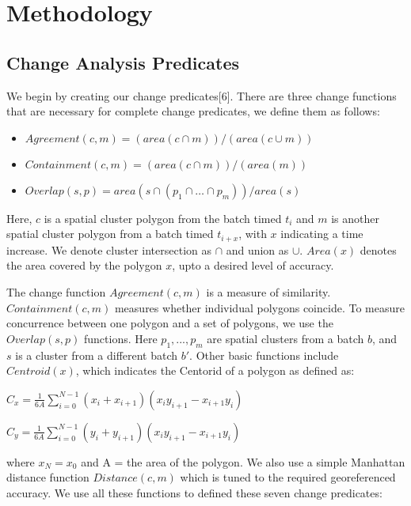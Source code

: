 \documentclass[conference]{IEEEtran}
\begin{document}
\section{Methodology}


\subsection{Change Analysis Predicates}

We begin by creating our change predicates[6]. There are three change functions that are necessary for complete change predicates, we define them as follows:

\begin{itemize}
	\item $Agreement (c, m) = (area(c\cap m))/(area(c\cup m))$
	\item $Containment (c, m) = (area(c\cap m))/(area(m))$
	\item $Overlap(s,p)= area(s\cap (p_1\cap …\cap p_m))/area(s)$

\end{itemize}

Here, $c$ is a spatial cluster polygon from the batch timed $t_i$ and $m$ is another spatial cluster polygon from a batch timed $t_{i+x}$, with $x$ indicating a time increase. We denote cluster intersection as $\cap$ and union as $\cup$. $Area(x)$ denotes the area covered by the polygon $x$, upto a desired level of accuracy.

The change function $Agreement(c, m)$ is a measure of similarity. $Containment(c, m)$ measures whether individual polygons coincide. To measure concurrence between one polygon and a set of polygons, we use the $Overlap(s,p)$ functions. Here $p_1,...,p_m$ are spatial clusters from a batch $b$, and $s$ is a cluster from a different batch $b'$. Other basic functions include $Centroid(x)$, which indicates the Centorid of a polygon as defined as:

$C_x =\frac{1}{6A} \sum_{i=0}^{N-1}(x_i+x_{i+1})(x_iy_{i+1}-x_{i+1}y_i)$

$C_y =\frac{1}{6A} \sum_{i=0}^{N-1}(y_i+y_{i+1})(x_iy_{i+1}-x_{i+1}y_i)$

where $x_N=x_0$ and A = the area of the polygon. We also use a simple Manhattan distance function $Distance(c, m)$ which is tuned to the required georeferenced accuracy. We use all these functions to defined these seven change predicates:
\end{document}
